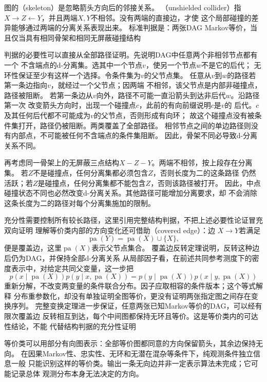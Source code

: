图的（skeleton）是忽略箭头方向后的邻接关系。
（unshielded collider）指
\(X\to Z\leftarrow Y\)，并且两端\(X,Y\)不相邻。没有两端的直接边，才使
这个局部碰撞的差异能够通过两端的分离关系表现出来。
标准判据是：两张DAG Markov等价，当且仅当具有相同骨架和相同无屏蔽碰撞结构

判据的必要性可以直接从全部路径证明。先说明DAG中任意两个非相邻节点都有一个
不含端点的d-分离集。选其中一个节点\(v\)，使另一个节点\(w\)不是它的后代；
无环性保证至少有这样一个选择。令条件集为\(v\)的父节点集。
任意从\(v\)到\(w\)的路径若第一条边指向\(v\)，就经过一个父节点；因两端
不相邻，该父节点是内部非碰撞点，路径被阻断。
若第一条边从\(v\)向外，路径不可能一直沿箭头到达非后代\(w\)。沿路径第一次
改变箭头方向时，出现一个碰撞点\(c\)，此前的有向前缀说明\(c\)是\(v\)的
后代。\(c\)及其任何后代都不可能成为\(v\)的父节点，否则形成有向环；
故这个碰撞点没有被条件集打开，路径仍被阻断。两类覆盖了全部路径。
相邻节点之间的单边路径则没有内部点，不可能被任何不含端点的条件集阻断。
因此，骨架不同必导致d-分离关系不同。

再考虑同一骨架上的无屏蔽三点结构\(X-Z-Y\)。两端不相邻，按上段存在分离集。
若\(Z\)不是碰撞点，任何分离集都必须包含\(Z\)，否则长度为二的这条路径
仍然活跃；若\(Z\)是碰撞点，任何分离集都不能包含\(Z\)，否则该路径被打开。
因此，中点碰撞状态不同也必然改变d-分离关系。其他路径可能增加分离要求，却
不会消除这条长度为二的路径对每个分离集施加的限制。

充分性需要控制所有较长路径，这里引用完整结构判据，不把上述必要性论证冒充
双向证明
理解等价类内部的方向变化还可借助（covered edge）：边
\(X\to Y\)若满足
\[
  \operatorname{pa}(Y)=\operatorname{pa}(X)\cup\{X\},
\]
便是覆盖边，这里\(\operatorname{pa}(X)\)表示父节点集合。
覆盖边反转定理说明，反转这种边后仍为DAG，并保持全部d-分离关系
从局部因子看，在前述共同参考测度下的密度表示中，对给定共同父变量，这一步把
\[
  p(x\mid\operatorname{pa}(X))
  p(y\mid x,\operatorname{pa}(X))
  =
  p(y\mid\operatorname{pa}(X))
  p(x\mid y,\operatorname{pa}(X))
\]
重新分解，不改变两变量的条件联合分布。因子应取相容的条件版本；这个等式解释
分布重参数化，却没有单独证明全图等价，更没有证明两张指定图之间存在变换序列。
完整变换定理进一步保证，任意两张已知Markov等价的DAG，可以经有限次覆盖边
反转相互到达，每个中间图都保持无环且等价。这是等价类内的可达性结论，不能
代替结构判据的充分性证明

等价类可以用部分有向图表示：全部等价图都同意的方向保留箭头，其余边保持无向。
在因果Markov性、忠实性、无环和无潜在混杂等条件下，纯观测条件独立信息一般
只能识别这样的等价类。输出一条无向边并非一定表示算法未完成；它可能记录总体
观测分布本身无法决定的方向。

